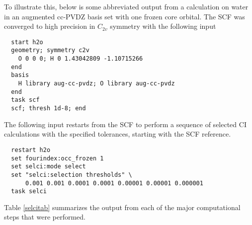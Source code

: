 To illustrate this, below is some abbreviated output from a
calculation on water in an augmented cc-PVDZ basis set with one frozen
core orbital.  The SCF was converged to high precision in $C_{2v}$
symmetry with the following input
\begin{verbatim}
  start h2o
  geometry; symmetry c2v
    O 0 0 0; H 0 1.43042809 -1.10715266
  end
  basis
    H library aug-cc-pvdz; O library aug-cc-pvdz
  end
  task scf
  scf; thresh 1d-8; end
\end{verbatim}

The following input restarts from the SCF to perform a sequence of
selected CI calculations with the specified tolerances, starting with
the SCF reference.
\begin{verbatim}
  restart h2o
  set fourindex:occ_frozen 1
  set selci:mode select
  set "selci:selection thresholds" \
      0.001 0.001 0.0001 0.0001 0.00001 0.00001 0.000001
  task selci
\end{verbatim}
Table \ref{selcitab} summarizes the output from each of the major
computational steps that were performed.
